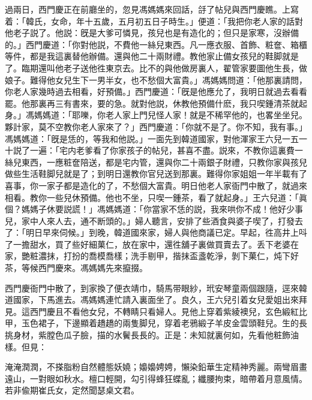 過兩日，西門慶正在前廳坐的，忽見馮媽媽來回話，㧱了帖兒與西門慶瞧。上寫着：「韓氏，女命，年十五歲，五月初五日子時生。」便道：「我把你老人家的話對他老子説了。他説：旣是大爹可憐見，孩兒也是有造化的；但只是家寒，沒辦備的。」西門慶道：「你對他説，不費他一絲兒東西。凡一應衣服、首飾、粧奩、箱櫃等件，都是我這裏替他辦備。還與他二十兩財禮。教他家止備女孩兒的鞋脚就是了。臨期還叫他老子送他徃東京去。比不的與他做房裏人，翟管家要圖他生長，做娘子。難得他女兒生下一男半女，也不愁個大富貴。」馮媽媽問道：「他那裏請問，你老人家幾時過去相看，好預備。」西門慶道：「旣是他應允了，我明日就過去看看罷。他那裏再三有書來，要的急。就對他説，休教他預備什麽，我只喫鍾清茶就起身。」馮媽媽道：「耶嚛，你老人家上門兒怪人家！就是不稀罕他的，也畧坐坐兒。夥計家，莫不空教你老人家來了？」西門慶道：「你就不是了。你不知，我有事。」馮媽媽道：「旣是恁的，等我和他説。」一面先到韓道國家，對他渾家王六兒一五一十説了一遍：「宅内老爹看了你家孩子的帖兒，甚喜不盡。説來，不教你這裏費一絲兒東西，一應粧奩陪送，都是宅内管，還與你二十兩銀子財禮，只教你家與孩兒做些生活鞋脚兒就是了；到明日還教你官兒送到那裏。難得你家姐姐一年半載有了喜事，你一家子都是造化的了，不愁個大富貴。明日他老人家衙門中散了，就過來相看。教你一些兒休預備。他也不坐，只喫一鍾茶，看了就起身。」王六兒道：「眞個？媽媽子休要説謊！」馮媽媽道：「你當家不恁的説，我來哄你不成！他好少事兒，家中人來人去，通不断頭的。」婦人聽言，安排了些酒食與婆子喫了，打發去了：「明日早來伺候。」到晚，韓道國來家，婦人與他商議已定。早起，徃高井上呌了一擔甜水，買了些好細菓仁，放在家中，還徃舖子裏做買賣去了。丢下老婆在家，艷粧濃抹，打扮的喬模喬樣；洗手剔甲，揩抹盃盞乾淨，剝下菓仁，炖下好茶，等候西門慶來。馮媽媽先來攛掇。

西門慶衙門中散了，到家換了便衣靖巾，騎馬带眼紗，玳安琴童兩個跟隨，逕來韓道國家，下馬進去。馮媽媽連忙請入裏面坐了。良久，王六兒引着女兒愛姐出來拜見。這西門慶且不看他女兒，不轉睛只看婦人。見他上穿着紫綾襖兒，玄色緞紅比甲，玉色裙子，下邊顯着趫趫的兩隻脚兒，穿着老鴉緞子羊皮金雲頭鞋兒。生的長挑身材，紫膛色瓜子臉，描的水鬢長長的。正是：未知就裏何如，先看他粧飾油樣。但見：

\begin{myquote}
淹淹潤潤，不搽脂粉自然體態妖嬈；嬝嬝娉娉，懶染鉛華生定精神秀麗。兩彎眉畫遠山，一對眼如秋水。檀口輕開，勾引得蜂狂蝶亂；纖腰拘束，暗帶着月意風情。若非偸期崔氏女，定然聞瑟桌文君。
\end{myquote}

